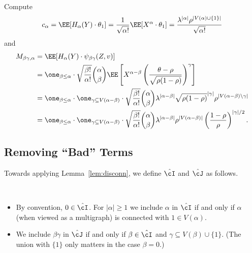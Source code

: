 \documentclass[11pt]{article}
\begin{document}
\noindent Compute
\[ c_\alpha = \EE[H_\alpha(Y) \cdot \theta_1] = \frac{1}{\sqrt{\alpha!}} \EE[X^\alpha \cdot \theta_1] = \frac{\lambda^{|\alpha|} \rho^{|V(\alpha) \cup \{1\}|}}{\sqrt{\alpha!}} \]
and
\begin{align*}
M_{\beta\gamma,\alpha} &= \EE[H_\alpha(Y) \cdot \psi_{\beta\gamma}(Z,v)] \\
&= \one_{\beta \le \alpha} \cdot \sqrt{\frac{\beta!}{\alpha!}} \binom{\alpha}{\beta} \EE\left[X^{\alpha-\beta}\left(\frac{\theta-\rho}{\sqrt{\rho(1-\rho)}}\right)^\gamma\right] \\
&= \one_{\beta \le \alpha} \cdot \one_{\gamma \subseteq V(\alpha-\beta)} \cdot \sqrt{\frac{\beta!}{\alpha!}} \binom{\alpha}{\beta} \lambda^{|\alpha - \beta|} \sqrt{\rho(1-\rho)}^{|\gamma|} \rho^{|V(\alpha-\beta) \setminus \gamma|} \\
&= \one_{\beta \le \alpha} \cdot \one_{\gamma \subseteq V(\alpha-\beta)} \cdot \sqrt{\frac{\beta!}{\alpha!}} \binom{\alpha}{\beta} \lambda^{|\alpha - \beta|} \rho^{|V(\alpha-\beta)|} \left(\frac{1-\rho}{\rho}\right)^{|\gamma|/2}.
\end{align*}


\subsection{Removing ``Bad'' Terms}

Towards applying Lemma~\ref{lem:disconn}, we define $\hat\cI$ and $\hat\cJ$ as follows.

\begin{definition}
\,
\begin{itemize}
    \item By convention, $0 \in \hat\cI$. For $|\alpha| \ge 1$ we include $\alpha$ in $\hat\cI$ if and only if $\alpha$ (when viewed as a multigraph) is connected with $1 \in V(\alpha)$.
    \item We include $\beta\gamma$ in $\hat\cJ$ if and only if $\beta \in \hat\cI$ and $\gamma \subseteq V(\beta) \cup \{1\}$. (The union with $\{1\}$ only matters in the case $\beta = 0$.)
\end{itemize}
\end{definition}
\end{document}
